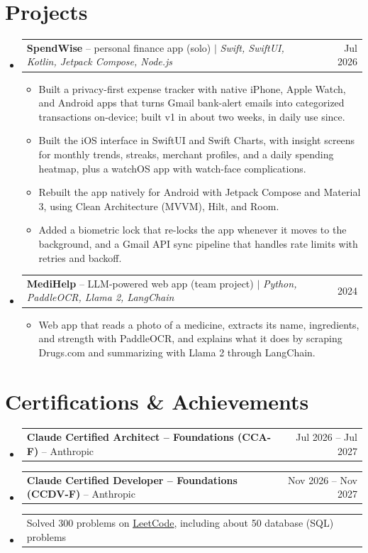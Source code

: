 \documentclass[a4paper,11pt]{article}
\makeatletter
\newcommand{\resumeItem}[1]{\item\small{#1\vspace{-1pt}}}
\newcommand{\resumeProjectHeading}[2]{
    \item
    \begin{tabularx}{0.97\textwidth}{@{}>{\raggedright\arraybackslash}X@{\hspace{0.75em}}r@{}}
      \small#1 & #2 \\
    \end{tabularx}\vspace{-3pt}
}
\newcommand{\resumeSubItemListStart}{\begin{itemize}[leftmargin=0.15in, label={}]}
\newcommand{\resumeSubItemListEnd}{\end{itemize}}
\newcommand{\resumeItemListStart}{\begin{itemize}[itemsep=2pt]}
\newcommand{\resumeItemListEnd}{\end{itemize}\vspace{-2pt}}
\makeatother
\begin{document}
\section{Projects}
  \resumeSubItemListStart

    \resumeProjectHeading
      {\textbf{SpendWise} -- personal finance app (solo) $|$ \emph{Swift, SwiftUI, Kotlin, Jetpack Compose, Node.js}}{Jul 2026}
      \resumeItemListStart
        \resumeItem{Built a privacy-first expense tracker with native iPhone, Apple Watch, and Android apps that turns Gmail bank-alert emails into categorized transactions on-device; built v1 in about two weeks, in daily use since.}
        \resumeItem{Built the iOS interface in SwiftUI and Swift Charts, with insight screens for monthly trends, streaks, merchant profiles, and a daily spending heatmap, plus a watchOS app with watch-face complications.}
        \resumeItem{Rebuilt the app natively for Android with Jetpack Compose and Material 3, using Clean Architecture (MVVM), Hilt, and Room.}
        \resumeItem{Added a biometric lock that re-locks the app whenever it moves to the background, and a Gmail API sync pipeline that handles rate limits with retries and backoff.}
      \resumeItemListEnd

    \resumeProjectHeading
      {\textbf{MediHelp} -- LLM-powered web app (team project) $|$ \emph{Python, PaddleOCR, Llama 2, LangChain}}{2024}
      \resumeItemListStart
        \resumeItem{Web app that reads a photo of a medicine, extracts its name, ingredients, and strength with PaddleOCR, and explains what it does by scraping Drugs.com and summarizing with Llama 2 through LangChain.}
      \resumeItemListEnd

  \resumeSubItemListEnd

\section{Certifications \& Achievements}
  \resumeSubItemListStart
    \resumeProjectHeading
      {\textbf{Claude Certified Architect -- Foundations (CCA-F)} -- Anthropic}{Jul 2026 -- Jul 2027}
    \resumeProjectHeading
      {\textbf{Claude Certified Developer -- Foundations (CCDV-F)} -- Anthropic}{Nov 2026 -- Nov 2027}
    \resumeProjectHeading
      {Solved 300 problems on \href{https://leetcode.com/u/sAMurai7781/}{\underline{LeetCode}}, including about 50 database (SQL) problems}{}
  \resumeSubItemListEnd
\end{document}
